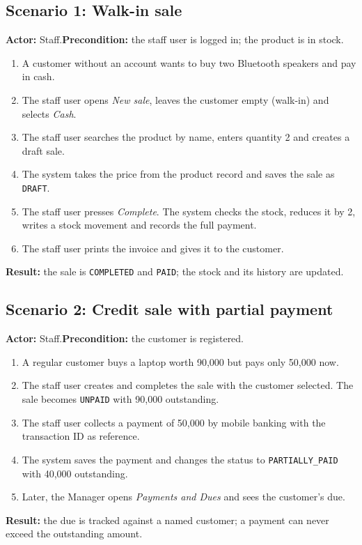 \documentclass[11pt,a4paper]{article}
\newcommand{\code}[1]{\texttt{#1}}
\begin{document}
\subsection{Scenario 1: Walk-in sale}
\textbf{Actor:} Staff.\quad \textbf{Precondition:} the staff user is logged in; the product is in stock.
\begin{enumerate}
  \item A customer without an account wants to buy two Bluetooth speakers and pay in cash.
  \item The staff user opens \emph{New sale}, leaves the customer empty (walk-in) and selects \emph{Cash}.
  \item The staff user searches the product by name, enters quantity 2 and creates a draft sale.
  \item The system takes the price from the product record and saves the sale as \code{DRAFT}.
  \item The staff user presses \emph{Complete}. The system checks the stock, reduces it by 2,
        writes a stock movement and records the full payment.
  \item The staff user prints the invoice and gives it to the customer.
\end{enumerate}
\textbf{Result:} the sale is \code{COMPLETED} and \code{PAID}; the stock and its history are updated.

\subsection{Scenario 2: Credit sale with partial payment}
\textbf{Actor:} Staff.\quad \textbf{Precondition:} the customer is registered.
\begin{enumerate}
  \item A regular customer buys a laptop worth 90,000 but pays only 50,000 now.
  \item The staff user creates and completes the sale with the customer selected.
        The sale becomes \code{UNPAID} with 90,000 outstanding.
  \item The staff user collects a payment of 50,000 by mobile banking with the transaction ID as reference.
  \item The system saves the payment and changes the status to \code{PARTIALLY\_PAID} with 40,000 outstanding.
  \item Later, the Manager opens \emph{Payments and Dues} and sees the customer's due.
\end{enumerate}
\textbf{Result:} the due is tracked against a named customer; a payment can never exceed the outstanding amount.
\end{document}
